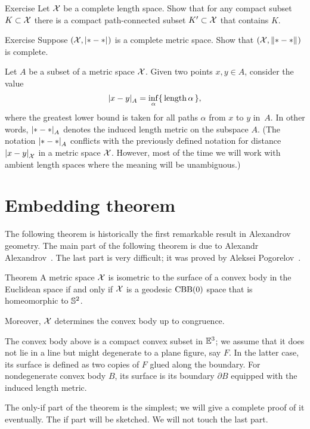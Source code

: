 \begin{thm}{Exercise}\label{ex:compact+connceted}
Let $\mathcal{X}$ be a complete length space.
Show that for any compact subset $K\subset\mathcal{X}$
there is a compact path-connected subset $K'\subset\mathcal{X}$ that contains $K$.  
\end{thm}

\begin{thm}{Exercise}\label{ex:compact=>complete}
Suppose $(\spc{X},\dist{*}{*}{})$ is a complete metric space.
Show that $(\spc{X},\yetdist{*}{*}{})$ is complete.
\end{thm}

Let $A$ be a subset of a metric space $\mathcal{X}$.
Given two points $x,y\in A$,
consider the value
\[\dist{x}{y}{A}=\inf_{\alpha}\{\,\length\alpha\,\},\]
where the greatest lower bound is taken for all paths $\alpha$ from $x$ to $y$ in~$A$.
In other words, $\dist{*}{*}{A}$ denotes the induced length metric on the subspace $A$.
(The notation $\dist{*}{*}{A}$ conflicts with the previously defined notation for distance $\dist{x}{y}{\spc{X}}$ in a metric space $\mathcal{X}$.
However, most of the time we will work with ambient length spaces where the meaning will be unambiguous.)

\section{Embedding theorem}

The following theorem is historically the first remarkable result in Alexandrov geometry.
The main part of the following theorem is due to Alexandr Alexandrov~\cite{alexandrov-1948}.
The last part is very difficult; it was proved by Aleksei Pogorelov~\cite{pogorelov}.

\begin{thm}{Theorem}\label{thm:alexandrov+pogorelov}
A metric space $\mathcal{X}$ is isometric to the surface of a convex body in the Euclidean space if and only if $\mathcal{X}$ is a geodesic $\mathrm{CBB}(0)$ space that is homeomorphic to $\mathbb{S}^2$.

Moreover, $\mathcal{X}$ determines the convex body up to congruence.
\end{thm}

The convex body above is a compact convex subset in $\mathbb{E}^3$;
we assume that it does not lie in a line but might degenerate to a plane figure, say $F$.
In the latter case, its surface is defined as two copies of $F$ glued along the boundary.
For nondegenerate convex body $B$, its surface is its boundary $\partial B$ equipped with the induced length metric. 

The only-if part of the theorem is the simplest; we will give a complete proof of it eventually.
The if part will be sketched.
We will not touch the last part.
